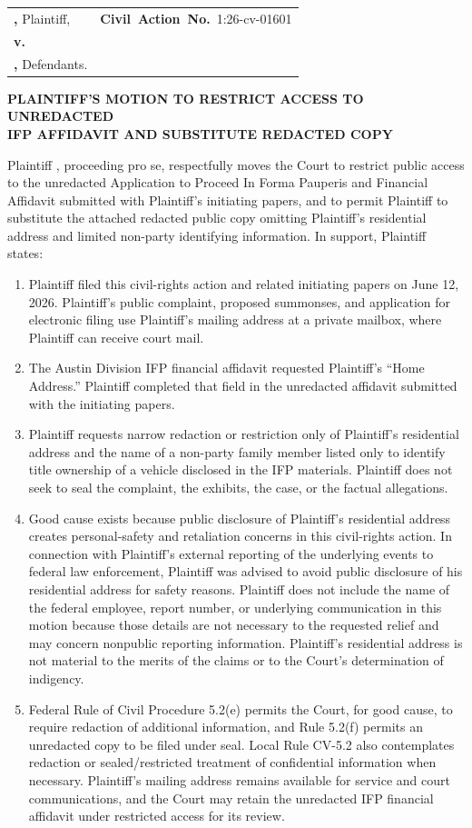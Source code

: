 \documentclass[12pt]{article}
\makeatletter
\newcommand{\RestrictMotionCaseNumber}{1:26-cv-01601}
\newcommand{\RestrictMotionCaption}{%
  \begin{center}
  \textbf{\FilingCourtName}\\
  \textbf{\FilingDistrictName}\\
  \textbf{\FilingDivisionName}
  \end{center}

  \vspace{1.25em}

  \noindent
  \begin{tabularx}{\textwidth}{@{}>{\raggedright\arraybackslash}X>{\raggedright\arraybackslash}p{2.45in}@{}}
  \textbf{\FilingPlaintiffNameUpper,} Plaintiff, & \mbox{\textbf{Civil Action No.} \RestrictMotionCaseNumber} \\
  \textbf{v.} & \\
  \textbf{\FilingDefendantsInlineUpper,} Defendants. & \\
  \end{tabularx}

  \vspace{1.25em}

  \begin{center}
  \textbf{PLAINTIFF'S MOTION TO RESTRICT ACCESS TO UNREDACTED}\\
  \textbf{IFP AFFIDAVIT AND SUBSTITUTE REDACTED COPY}
  \end{center}
}
\makeatother
\begin{document}

\RestrictMotionCaption

Plaintiff \FilingPlaintiffName, proceeding pro se, respectfully moves the Court to restrict public access to the unredacted Application to Proceed In Forma Pauperis and Financial Affidavit submitted with Plaintiff's initiating papers, and to permit Plaintiff to substitute the attached redacted public copy omitting Plaintiff's residential address and limited non-party identifying information. In support, Plaintiff states:

\begin{enumerate}
\item Plaintiff filed this civil-rights action and related initiating papers on June 12, 2026. Plaintiff's public complaint, proposed summonses, and application for electronic filing use Plaintiff's mailing address at a private mailbox, where Plaintiff can receive court mail.

\item The Austin Division IFP financial affidavit requested Plaintiff's ``Home Address.'' Plaintiff completed that field in the unredacted affidavit submitted with the initiating papers.

\item Plaintiff requests narrow redaction or restriction only of Plaintiff's residential address and the name of a non-party family member listed only to identify title ownership of a vehicle disclosed in the IFP materials. Plaintiff does not seek to seal the complaint, the exhibits, the case, or the factual allegations.

\item Good cause exists because public disclosure of Plaintiff's residential address creates personal-safety and retaliation concerns in this civil-rights action. In connection with Plaintiff's external reporting of the underlying events to federal law enforcement, Plaintiff was advised to avoid public disclosure of his residential address for safety reasons. Plaintiff does not include the name of the federal employee, report number, or underlying communication in this motion because those details are not necessary to the requested relief and may concern nonpublic reporting information. Plaintiff's residential address is not material to the merits of the claims or to the Court's determination of indigency.

\item Federal Rule of Civil Procedure 5.2(e) permits the Court, for good cause, to require redaction of additional information, and Rule 5.2(f) permits an unredacted copy to be filed under seal. Local Rule CV-5.2 also contemplates redaction or sealed/restricted treatment of confidential information when necessary. Plaintiff's mailing address remains available for service and court communications, and the Court may retain the unredacted IFP financial affidavit under restricted access for its review.
\end{enumerate}
\end{document}
